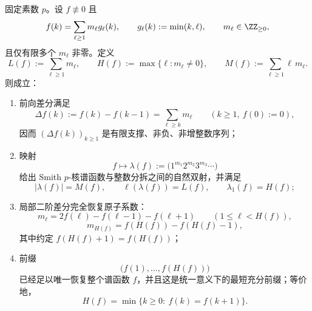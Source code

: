 \begin{theorem}\label{thm:conclusion-smith-pkernel-partition-curvature-plateau}
固定素数 \(p\)。设 \(f\not\equiv 0\) 且
\[
f(k)=\sum_{\ell\ge 1}m_\ell g_\ell(k),
\qquad
g_\ell(k):=\min(k,\ell),
\qquad
m_\ell\in \ZZ_{\ge 0},
\]
且仅有限多个 \(m_\ell\) 非零。定义
\[
L(f):=\sum_{\ell\ge 1}m_\ell,
\qquad
H(f):=\max\{\ell:m_\ell\neq 0\},
\qquad
M(f):=\sum_{\ell\ge 1}\ell\,m_\ell.
\]
则成立：
\begin{enumerate}
\item 前向差分满足
\[
\Delta f(k):=f(k)-f(k-1)=\sum_{\ell\ge k}m_\ell
\qquad(k\ge 1,\ f(0):=0),
\]
因而 \((\Delta f(k))_{k\ge 1}\) 是有限支撑、非负、非增整数序列；
\item 映射
\[
f\longmapsto \lambda(f):=\bigl(1^{m_1}2^{m_2}3^{m_3}\cdots\bigr)
\]
给出 Smith \(p\)-核谱函数与整数分拆之间的自然双射，并满足
\[
|\lambda(f)|=M(f),
\qquad
\ell(\lambda(f))=L(f),
\qquad
\lambda_1(f)=H(f);
\]
\item 局部二阶差分完全恢复原子系数：
\[
m_\ell=2f(\ell)-f(\ell-1)-f(\ell+1)
\qquad(1\le \ell<H(f)),
\]
\[
m_{H(f)}=f(H(f))-f(H(f)-1),
\]
其中约定 \(f(H(f)+1)=f(H(f))\)；
\item 前缀
\[
\bigl(f(1),\dots,f(H(f))\bigr)
\]
已经足以唯一恢复整个谱函数 \(f\)，并且这是统一意义下的最短充分前缀；等价地，
\[
H(f)=\min\{k\ge 0:\ f(k)=f(k+1)\}.
\]
\end{enumerate}
\end{theorem}
